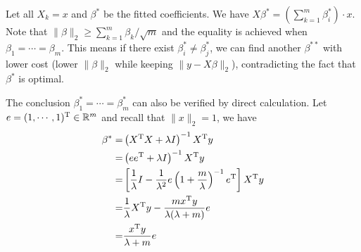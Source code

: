 \setcounter{sol}{28}
\begin{sol}
	Let all $X_k=x$ and $\beta^*$ be the fitted coefficients. We have $X\beta^*=(\sum_{k=1}^m\beta_i^*)\cdot x$. Note that $\|\beta\|_2\ge \sum_{k=1}^m\beta_k/\sqrt{m}$ and the equality is achieved when $\beta_1=\cdots=\beta_m$. This means if there exist $\beta^*_i\ne\beta^*_j$, we can find another $\beta^{**}$ with lower cost (lower $\|\beta\|_2$ while keeping $\|y-X\beta\|_2$), contradicting the fact that $\beta^*$ is optimal.
	
	The conclusion $\beta^*_1=\cdots=\beta^*_m$ can also be verified by direct calculation. Let $e=(1,\cdots,1)^{\mathrm{T}}\in\mathbb{R}^m$ and recall that $\|x\|_2=1$, we have
	\begin{align*}
	\beta^*=&\left(X^{\mathrm{T}}X+\lambda I\right)^{-1}X^{\mathrm{T}}y\\
	=& \left(ee^{\mathrm{T}}+\lambda I\right)^{-1}X^{\mathrm{T}}y\\
	=& \left[\frac{1}{\lambda}I-\frac{1}{\lambda^2}e\left(1+\frac{m}{\lambda}\right)^{-1}e^{\mathrm{T}}\right]X^{\mathrm{T}}y\\
	=& \frac{1}{\lambda}X^{\mathrm{T}}y-\frac{mx^{\mathrm{T}}y}{\lambda(\lambda+m)}e\\
	=& \frac{x^{\mathrm{T}}y}{\lambda+m}e
	\end{align*}
\end{sol}